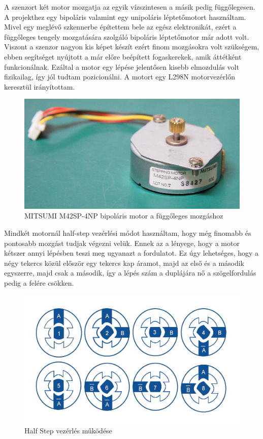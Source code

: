 \documentclass[]{thesis-ekf}
\theoremstyle{definition}
\theoremstyle{remark}
\begin{document}
A szenzort két motor mozgatja az egyik vízszintesen a másik pedig függőlegesen. A projekthez egy bipoláris valamint egy unipoláris léptetőmotort\cite{motorvezerlok} használtam. Mivel egy meglévő szkennerbe építettem bele az egész elektronikát, ezért a függőleges tengely mozgatására szolgáló bipoláris léptetőmotor már adott volt. Viszont a szenzor nagyon kis képet készít ezért finom mozgásokra volt szükségem, ebben segítséget nyújtott a már előre beépített fogaskerekek, amik áttétként funkcionálnak. Ezáltal a motor egy lépése jelentősen kisebb elmozdulás volt fizikailag, így jól tudtam pozicionálni. A motort egy L298N\cite{l298n} motorvezérlőn keresztül irányítottam.
\begin{figure}[th!]
	\centering
	\includegraphics[width=0.4\linewidth]{MITSUMI-Stepping-Motor-M42SP-4NP}
	\caption[Mitsumi]{\footnotesize {MITSUMI M42SP-4NP bipoláris motor a függőleges mozgáshoz}}
	\label{fig:mitsumi-stepping-motor-m42sp-4np}
\end{figure}

Mindkét motornál half-step vezérlési módot használtam, hogy még finomabb és pontosabb mozgást tudjak végezni velük. Ennek az a lényege, hogy a motor kétszer annyi lépésben teszi meg ugyanazt a fordulatot. Ez úgy lehetséges, hogy a négy tekercs közül először egy tekercs kap áramot, majd az első és a második egyszerre, majd csak a második, így a lépés szám a duplájára nő a szögelfordulás pedig a felére csökken.

\begin{figure}[th!]
	\centering
	\includegraphics[width=0.5\linewidth]{stepper-motors-half-step}
	\caption[Half Step vezérlés]{Half Step vezérlés működése}
	\label{fig:stepper-motors-half-step}
\end{figure}
\end{document}
